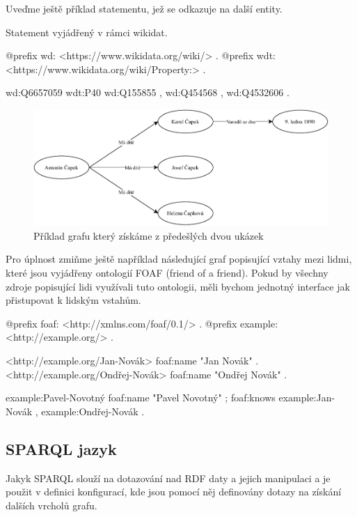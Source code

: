 Uveďme ještě příklad statementu, jež se odkazuje na další entity.
\begin{prikl}
Statement  vyjádřený v rámci wikidat.
\begin{code}
@prefix wd: <https://www.wikidata.org/wiki/> .
@prefix wdt: <https://www.wikidata.org/wiki/Property:> .

wd:Q6657059 wdt:P40 wd:Q155855 ,
                    wd:Q454568 ,
                    wd:Q4532606 .
\end{code}
\end{prikl}

\begin{figure}[h]
    \centering
    \includegraphics[width=\textwidth]{media/rdf.pdf}
    \caption{Příklad grafu který získáme z předešlých dvou ukázek}
\end{figure}

Pro úplnost zmiňme ještě například následující graf popisující vztahy mezi lidmi, které jsou vyjádřeny ontologií FOAF (friend of a friend). Pokud by všechny zdroje popisující lidi využívali tuto ontologii, měli bychom jednotný interface jak přistupovat k lidským vstahům.

\begin{code}
@prefix foaf: <http://xmlns.com/foaf/0.1/> .
@prefix example: <http://example.org/> .

<http://example.org/Jan-Novák> foaf:name "Jan Novák" .
<http://example.org/Ondřej-Novák> foaf:name "Ondřej Novák" .

example:Pavel-Novotný foaf:name "Pavel Novotný" ;
                      foaf:knows example:Jan-Novák ,
                                 example:Ondřej-Novák .
\end{code}

\subsection{SPARQL jazyk}
Jakyk SPARQL slouží na dotazování nad RDF daty a jejich manipulaci a je použit v definici konfigurací, kde jsou pomocí něj definovány dotazy na získání dalších vrcholů grafu.
